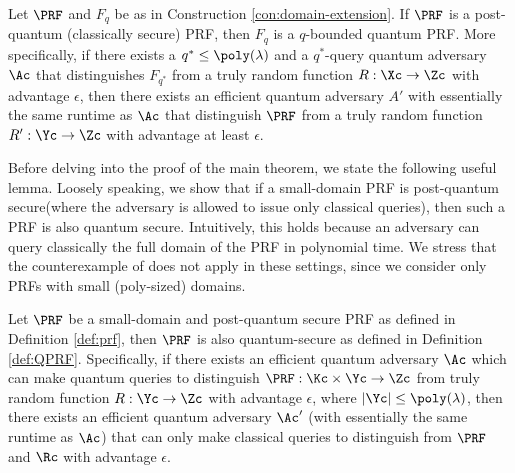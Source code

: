 \begin{theorem}\label{the:domain-extension}
	Let $\PRF$ and $F_q$ be as in Construction \ref{con:domain-extension}. If $\PRF$ is a post-quantum (classically secure) PRF, then $F_q$ is a $q$-bounded quantum PRF. More specifically, if there exists a $q^*\leq \poly(\lambda)$ and a $q^*$-query quantum adversary $\Ac$ that distinguishes $F_{q^*}$ from a truly random function $R: \Xc\to\Zc$ with advantage $\epsilon$, then there exists an efficient quantum adversary $A'$ with essentially the same runtime as $\Ac$ that distinguish $\PRF$ from a truly random function $R':\Yc \to \Zc$ with advantage at least $\epsilon$.
\end{theorem}
%
Before delving into the proof of the main theorem, we state the following useful lemma. Loosely speaking, we show that if a small-domain PRF is post-quantum secure\footnotemark (where the adversary is allowed to issue only classical queries), then such a PRF is also quantum secure. Intuitively, this holds because an adversary can query classically the full domain of the PRF in polynomial time. We stress that the counterexample of \cite{FOCS:Zhandry12} does not apply in these settings, since we consider only PRFs with small (poly-sized) domains.
\begin{lemma}\label{lem:standard-secure-PRF}
	Let $\PRF$ be a small-domain and post-quantum secure PRF as defined in Definition \ref{def:prf}, then $\PRF$ is also quantum-secure as defined in Definition \ref{def:QPRF}. Specifically, if there exists an efficient quantum adversary $\Ac$ which can make quantum queries to distinguish $\PRF:\Kc \times \Yc \to \Zc$ from truly random function $R:\Yc\to\Zc$ with advantage $\epsilon$, where $|\Yc|\le\poly(\lambda)$, then there exists an efficient quantum adversary $\Ac'$ (with essentially the same runtime as $\Ac$) that can only make classical queries to distinguish from $\PRF$ and $\Rc$ with advantage $\epsilon$.
\end{lemma}
